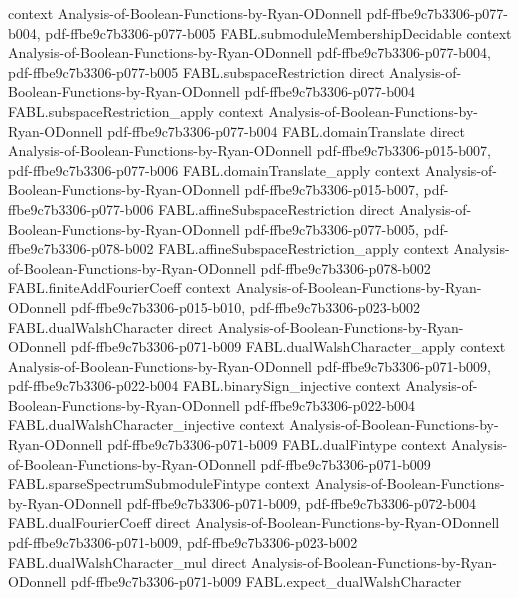 \begin{theorem}
  {context}
  {Analysis-of-Boolean-Functions-by-Ryan-ODonnell}
  {pdf-ffbe9c7b3306-p077-b004,
    pdf-ffbe9c7b3306-p077-b005}
\proofstep
  {FABL.submoduleMembershipDecidable}
  {context}
  {Analysis-of-Boolean-Functions-by-Ryan-ODonnell}
  {pdf-ffbe9c7b3306-p077-b004,
    pdf-ffbe9c7b3306-p077-b005}
\proofstep
  {FABL.subspaceRestriction}
  {direct}
  {Analysis-of-Boolean-Functions-by-Ryan-ODonnell}
  {pdf-ffbe9c7b3306-p077-b004}
\proofstep
  {FABL.subspaceRestriction_apply}
  {context}
  {Analysis-of-Boolean-Functions-by-Ryan-ODonnell}
  {pdf-ffbe9c7b3306-p077-b004}
\proofstep
  {FABL.domainTranslate}
  {direct}
  {Analysis-of-Boolean-Functions-by-Ryan-ODonnell}
  {pdf-ffbe9c7b3306-p015-b007,
    pdf-ffbe9c7b3306-p077-b006}
\proofstep
  {FABL.domainTranslate_apply}
  {context}
  {Analysis-of-Boolean-Functions-by-Ryan-ODonnell}
  {pdf-ffbe9c7b3306-p015-b007,
    pdf-ffbe9c7b3306-p077-b006}
\proofstep
  {FABL.affineSubspaceRestriction}
  {direct}
  {Analysis-of-Boolean-Functions-by-Ryan-ODonnell}
  {pdf-ffbe9c7b3306-p077-b005,
    pdf-ffbe9c7b3306-p078-b002}
\proofstep
  {FABL.affineSubspaceRestriction_apply}
  {context}
  {Analysis-of-Boolean-Functions-by-Ryan-ODonnell}
  {pdf-ffbe9c7b3306-p078-b002}
\proofstep
  {FABL.finiteAddFourierCoeff}
  {context}
  {Analysis-of-Boolean-Functions-by-Ryan-ODonnell}
  {pdf-ffbe9c7b3306-p015-b010,
    pdf-ffbe9c7b3306-p023-b002}
\proofstep
  {FABL.dualWalshCharacter}
  {direct}
  {Analysis-of-Boolean-Functions-by-Ryan-ODonnell}
  {pdf-ffbe9c7b3306-p071-b009}
\proofstep
  {FABL.dualWalshCharacter_apply}
  {context}
  {Analysis-of-Boolean-Functions-by-Ryan-ODonnell}
  {pdf-ffbe9c7b3306-p071-b009,
    pdf-ffbe9c7b3306-p022-b004}
\proofstep
  {FABL.binarySign_injective}
  {context}
  {Analysis-of-Boolean-Functions-by-Ryan-ODonnell}
  {pdf-ffbe9c7b3306-p022-b004}
\proofstep
  {FABL.dualWalshCharacter_injective}
  {context}
  {Analysis-of-Boolean-Functions-by-Ryan-ODonnell}
  {pdf-ffbe9c7b3306-p071-b009}
\proofstep
  {FABL.dualFintype}
  {context}
  {Analysis-of-Boolean-Functions-by-Ryan-ODonnell}
  {pdf-ffbe9c7b3306-p071-b009}
\proofstep
  {FABL.sparseSpectrumSubmoduleFintype}
  {context}
  {Analysis-of-Boolean-Functions-by-Ryan-ODonnell}
  {pdf-ffbe9c7b3306-p071-b009,
    pdf-ffbe9c7b3306-p072-b004}
\proofstep
  {FABL.dualFourierCoeff}
  {direct}
  {Analysis-of-Boolean-Functions-by-Ryan-ODonnell}
  {pdf-ffbe9c7b3306-p071-b009,
    pdf-ffbe9c7b3306-p023-b002}
\proofstep
  {FABL.dualWalshCharacter_mul}
  {direct}
  {Analysis-of-Boolean-Functions-by-Ryan-ODonnell}
  {pdf-ffbe9c7b3306-p071-b009}
\proofstep
  {FABL.expect_dualWalshCharacter}

\end{theorem}
